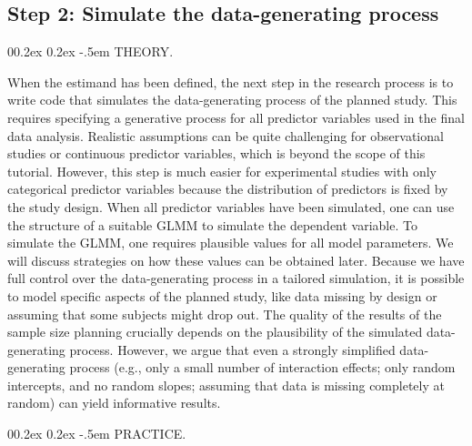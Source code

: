 \documentclass[
  man,
  floatsintext,
  longtable,
  a4paper,
  nolmodern,
  notxfonts,
  notimes,
  colorlinks=true,linkcolor=blue,citecolor=blue,urlcolor=blue]{apa7}
\makeatletter
\renewcommand{\paragraph}{\@startsection{paragraph}{4}{\parindent}%
	{0\baselineskip \@plus 0.2ex \@minus 0.2ex}%
	{-.5em}%
	{\normalfont\normalsize\bfseries\typesectitle}}
\makeatother
\begin{document}
\subsection{Step 2: Simulate the data-generating
process}\label{step-2-simulate-the-data-generating-process}

\paragraph{THEORY.}\label{theory-1}

When the estimand has been defined, the next step in the research
process is to write code that simulates the data-generating process of
the planned study. This requires specifying a generative process for all
predictor variables used in the final data analysis. Realistic
assumptions can be quite challenging for observational studies or
continuous predictor variables, which is beyond the scope of this
tutorial. However, this step is much easier for experimental studies
with only categorical predictor variables because the distribution of
predictors is fixed by the study design. When all predictor variables
have been simulated, one can use the structure of a suitable GLMM to
simulate the dependent variable. To simulate the GLMM, one requires
plausible values for all model parameters. We will discuss strategies on
how these values can be obtained later. Because we have full control
over the data-generating process in a tailored simulation, it is
possible to model specific aspects of the planned study, like data
missing by design or assuming that some subjects might drop out. The
quality of the results of the sample size planning crucially depends on
the plausibility of the simulated data-generating process. However, we
argue that even a strongly simplified data-generating process (e.g.,
only a small number of interaction effects; only random intercepts, and
no random slopes; assuming that data is missing completely at random)
can yield informative results.

\paragraph{PRACTICE.}\label{practice-1}
\end{document}
